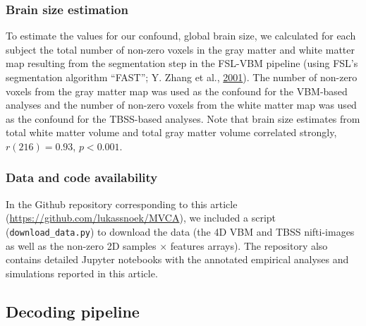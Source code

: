 \documentclass[11pt,american,]{memoir} %
\begin{document}
\hypertarget{confounds-decoding-methods-data-brainsize}{%
\subsubsection{Brain size estimation}\label{confounds-decoding-methods-data-brainsize}}

To estimate the values for our confound, global brain size, we calculated for each subject the total number of non-zero voxels in the gray matter and white matter map resulting from the segmentation step in the FSL-VBM pipeline (using FSL's segmentation algorithm ``FAST''; Y. Zhang et al., \protect\hyperlink{ref-Zhang2001-wa}{2001}). The number of non-zero voxels from the gray matter map was used as the confound for the VBM-based analyses and the number of non-zero voxels from the white matter map was used as the confound for the TBSS-based analyses. Note that brain size estimates from total white matter volume and total gray matter volume correlated strongly, \(r (216) = 0.93\), \(p < 0.001\).

\hypertarget{confounds-decoding-methods-data-data-and-code}{%
\subsubsection{Data and code availability}\label{confounds-decoding-methods-data-data-and-code}}

In the Github repository corresponding to this article (\url{https://github.com/lukassnoek/MVCA}), we included a script (\texttt{download\_data.py}) to download the data (the 4D VBM and TBSS nifti-images as well as the non-zero 2D samples × features arrays). The repository also contains detailed Jupyter notebooks with the annotated empirical analyses and simulations reported in this article.

\hypertarget{confounds-decoding-methods-pipeline}{%
\subsection{Decoding pipeline}\label{confounds-decoding-methods-pipeline}}
\end{document}
